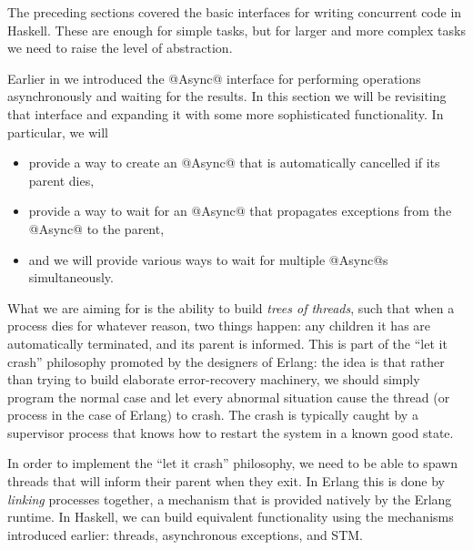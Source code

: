 
The preceding sections covered the basic interfaces for writing
concurrent code in Haskell.  These are enough for simple tasks, but
for larger and more complex tasks we need to raise the level of
abstraction.

Earlier in  we introduced the @Async@ interface for
performing operations asynchronously and waiting for the results.  In
this section we will be revisiting that interface and expanding it
with some more sophisticated functionality.  In particular, we will

\begin{itemize}
\item provide a way to create an @Async@ that is automatically
  cancelled if its parent dies,
\item provide a way to wait for an @Async@ that propagates exceptions
  from the @Async@ to the parent,
\item and we will provide various ways to wait for multiple @Async@s simultaneously.
\end{itemize}

What we are aiming for is the ability to build \emph{trees of
  threads}, such that when a process dies for whatever reason, two
things happen: any children it has are automatically terminated, and
its parent is informed.  This is part of the ``let it crash''
philosophy promoted by the designers of Erlang: the idea is that
rather than trying to build elaborate error-recovery machinery, we
should simply program the normal case and let every abnormal situation
cause the thread (or process in the case of Erlang) to crash.  The
crash is typically caught by a supervisor process that knows how to
restart the system in a known good state.

In order to implement the ``let it crash'' philosophy, we need to be
able to spawn threads that will inform their parent when they exit.
In Erlang this is done by \emph{linking} processes together, a
mechanism that is provided natively by the Erlang runtime.  In
Haskell, we can build equivalent functionality using the mechanisms
introduced earlier: threads, asynchronous exceptions, and STM.

